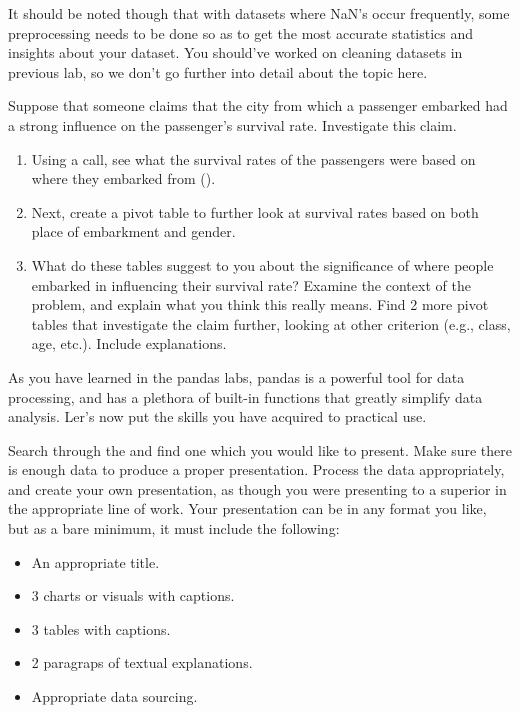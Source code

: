 It should be noted though that with datasets where NaN's occur frequently, some preprocessing needs to be done so as to get the most accurate statistics and insights about your dataset. You should've worked on cleaning datasets in previous lab, so we don't go further into detail about the topic here.

\begin{problem}
Suppose that someone claims that the city from which a passenger embarked had a strong influence on the passenger's survival rate. Investigate this claim.
\begin{enumerate}
\item Using a  call, see what the survival rates of the passengers were based on where they embarked from ().
\item Next, create a pivot table to further look at survival rates based on both place of embarkment and gender.
\item What do these tables suggest to you about the significance of where people embarked in influencing their survival rate? Examine the context of the problem, and explain what you think this really means. Find 2 more pivot tables that investigate the claim further, looking at other criterion (e.g., class, age, etc.). Include explanations.
\end{enumerate}
\end{problem}

As you have learned in the pandas labs, pandas is a powerful tool for data processing, and has a plethora of built-in functions that greatly simplify data analysis.  Ler's now put the skills you have acquired to practical use.

\begin{problem}
Search through the  and find one which you would like to present.  Make sure there is enough data to produce a proper presentation. Process the data appropriately, and create your own presentation, as though you were presenting to a superior in the appropriate line of work.  Your presentation can be in any format you like, but as a bare minimum, it must include the following:
\begin{itemize}
\item An appropriate title.
\item 3 charts or visuals with captions.
\item 3 tables with captions.
\item 2 paragraps of textual explanations.
\item Appropriate data sourcing.
\end{itemize}
\end{problem} 









